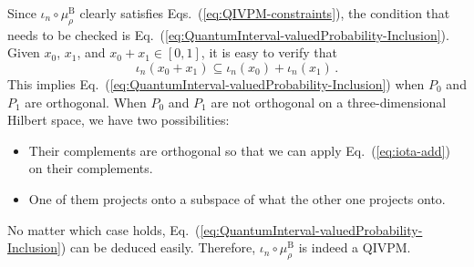 \documentclass[english,reprint, aps, prl,superscriptaddress, showpacs,
showkeys, longbibliography, amsmath, amssymb, floatfix]{revtex4-1}
\theoremstyle{plain}
\theoremstyle{definition}
\begin{document}
\noindent Since $\iota_{n}\circ\mu_{\rho}^{\mathrm{B}}$ clearly satisfies
Eqs.~(\ref{eq:QIVPM-constraints}), the condition that needs to be
checked is Eq.~(\ref{eq:QuantumInterval-valuedProbability-Inclusion}).
Given $x_{0}$, $x_{1}$, and $x_{0}+x_{1}\in\left[0,1\right]$, it
is easy to verify that
\begin{equation}
\iota_{n}\left(x_{0}+x_{1}\right)\subseteq\iota_{n}\left(x_{0}\right)+\iota_{n}\left(x_{1}\right)\,.\label{eq:iota-add}
\end{equation}
This implies Eq.~(\ref{eq:QuantumInterval-valuedProbability-Inclusion})
when $P_{0}$ and $P_{1}$ are orthogonal. When $P_{0}$ and $P_{1}$
are not orthogonal on a three-dimensional Hilbert space, we have two
possibilities:
\begin{itemize}
\item Their complements are orthogonal so that we can apply Eq.~(\ref{eq:iota-add})
on their complements.
\item One of them projects onto a subspace of what the other one projects
onto.
\end{itemize}
\noindent No matter which case holds, Eq.~(\ref{eq:QuantumInterval-valuedProbability-Inclusion})
can be deduced easily. Therefore, $\iota_{n}\circ\mu_{\rho}^{\mathrm{B}}$
is indeed a QIVPM.
\end{document}
